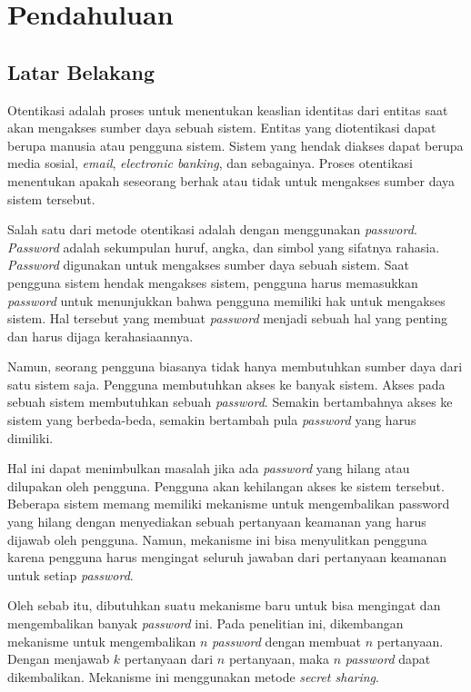 \chapter{Pendahuluan} \label{chap:Pendahuluan}

\section{Latar Belakang}
\label{sec:latarbelakang}

Otentikasi adalah proses untuk menentukan keaslian identitas dari entitas saat akan mengakses sumber daya sebuah sistem. Entitas yang diotentikasi dapat berupa manusia atau pengguna sistem. Sistem yang hendak diakses dapat berupa media sosial, \textit{email}, \textit{electronic banking}, dan sebagainya. Proses otentikasi menentukan apakah seseorang berhak atau tidak untuk mengakses sumber daya sistem tersebut.

Salah satu dari metode otentikasi adalah dengan menggunakan \textit{password}. \textit{Password} adalah sekumpulan huruf, angka, dan simbol yang sifatnya rahasia. \textit{Password} digunakan untuk mengakses sumber daya sebuah sistem. Saat pengguna sistem hendak mengakses sistem, pengguna harus memasukkan \textit{password} untuk menunjukkan bahwa pengguna memiliki hak untuk mengakses sistem.
Hal tersebut yang membuat \textit{password} menjadi sebuah hal yang penting dan harus dijaga kerahasiaannya.

Namun, seorang pengguna biasanya tidak hanya membutuhkan sumber daya dari satu sistem saja. Pengguna membutuhkan akses ke banyak sistem. Akses pada sebuah sistem membutuhkan sebuah \textit{password}. Semakin bertambahnya akses ke sistem yang berbeda-beda, semakin bertambah pula \textit{password} yang harus dimiliki.

Hal ini dapat menimbulkan masalah jika ada \textit{password} yang hilang atau dilupakan oleh pengguna. Pengguna akan kehilangan akses ke sistem tersebut. Beberapa sistem memang memiliki mekanisme untuk mengembalikan password yang hilang dengan menyediakan sebuah pertanyaan keamanan yang harus dijawab oleh pengguna. Namun, mekanisme ini bisa menyulitkan pengguna karena pengguna harus mengingat seluruh jawaban dari pertanyaan keamanan untuk setiap \textit{password}.

Oleh sebab itu, dibutuhkan suatu mekanisme baru untuk bisa mengingat dan mengembalikan banyak \textit{password} ini. Pada penelitian ini, dikembangan mekanisme untuk mengembalikan $n$ \textit{password} dengan membuat $n$ pertanyaan. Dengan menjawab $k$ pertanyaan dari $n$ pertanyaan, maka $n$ \textit{password} dapat dikembalikan. Mekanisme ini menggunakan metode \textit{secret sharing}.

